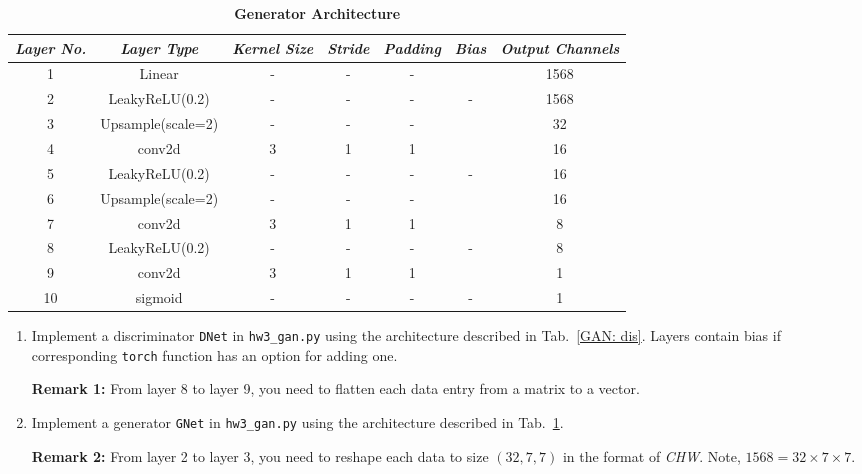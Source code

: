 \begin{Q}
	\begin{table}[h]
		\begin{center}
			\caption{\textbf{Generator Architecture}}
			\label{GAN: gen}
			\begin{tabular}{ccccccc}
				\toprule
				{\small\textit{Layer No.}}
				& {\small \textit{Layer Type}}
				& {\small \textit{Kernel Size}}
				& {\small \textit{Stride}}
				& {\small \textit{Padding}}
				& {\small \textit{Bias}}
				& {\small \textit{Output Channels}} \\
				\midrule
				1 & Linear             & - & - & - & \cmark & 1568 \\
				2 & LeakyReLU(0.2)     & - & - & - & -      & 1568 \\
				3 & Upsample(scale=2)  & - & - & - & \xmark & 32 \\
				4 & conv2d             & 3 & 1 & 1 & \cmark & 16 \\
				5 & LeakyReLU(0.2)     & - & - & - & -      & 16 \\
				6 & Upsample(scale=2)  & - & - & - & \xmark & 16 \\
				7 & conv2d             & 3 & 1 & 1 & \cmark & 8 \\
				8 & LeakyReLU(0.2)     & - & - & - & -      & 8 \\
				9 & conv2d             & 3 & 1 & 1 & \cmark & 1 \\
				10 & sigmoid           & - & - & - & -      & 1 \\
				\bottomrule
			\end{tabular}
		\end{center}
	\end{table}
	
	\begin{enumerate}
		\item Implement a discriminator \texttt{DNet} in \texttt{hw3\_gan.py} using the architecture described in Tab.\ \ref{GAN: dis}. Layers contain bias if corresponding \texttt{torch} function has an option for adding one.
		
		\textbf{Remark 1:} From layer 8 to layer 9, you need to flatten each data entry from a matrix to a vector.
		
		\item Implement a generator \texttt{GNet} in \texttt{hw3\_gan.py} using the architecture described in Tab.\ \ref{GAN: gen}.
		
		\textbf{Remark 2:} From layer 2 to layer 3, you need to reshape each data to size $(32, 7, 7)$ in the format of \textit{CHW}. Note,  $1568 = 32\times7\times7$.
		

\end{enumerate}
\end{Q}
